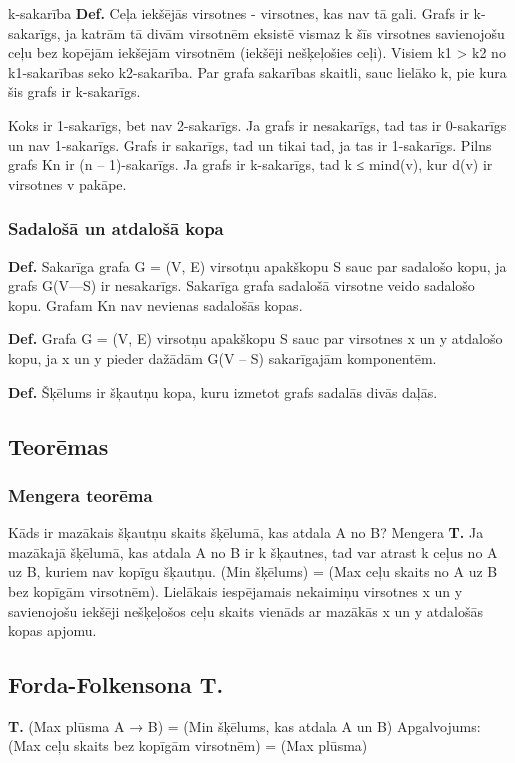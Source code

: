 \documentclass{article}
\begin{document}
k-sakarība
\textbf{Def.} Ceļa iekšējās virsotnes - virsotnes, kas nav tā gali.  Grafs ir k-sakarīgs, ja katrām tā divām virsotnēm eksistē vismaz k šīs virsotnes savienojošu ceļu bez kopējām iekšējām virsotnēm (iekšēji nešķeļošies ceļi).  Visiem k1 > k2 no k1-sakarības seko k2-sakarība.  Par grafa sakarības skaitli, sauc lielāko k, pie kura šis grafs ir k-sakarīgs.

Koks ir 1-sakarīgs, bet nav 2-sakarīgs.  Ja grafs ir nesakarīgs, tad tas ir 0-sakarīgs un nav 1-sakarīgs.  Grafs ir sakarīgs, tad un tikai tad, ja tas ir 1-sakarīgs.  Pilns grafs Kn ir (n – 1)-sakarīgs.  Ja grafs ir k-sakarīgs, tad k ≤ mind(v), kur d(v) ir virsotnes v pakāpe.

\subsubsection{Sadalošā un atdalošā kopa}

\textbf{Def.}  Sakarīga grafa G = (V, E) virsotņu apakškopu S sauc par sadalošo kopu, ja grafs
G(V—S) ir nesakarīgs.
Sakarīga grafa sadalošā virsotne veido sadalošo kopu.  Grafam Kn nav nevienas sadalošās kopas.

\textbf{Def.}  Grafa G = (V, E) virsotņu apakškopu S sauc par virsotnes x un y atdalošo kopu, ja x un y pieder dažādām G(V – S) sakarīgajām komponentēm.

\textbf{Def.} Šķēlums ir šķautņu kopa, kuru izmetot grafs sadalās divās daļās.

\subsection{Teorēmas}

\subsubsection{Mengera teorēma}
Kāds ir mazākais šķautņu skaits šķēlumā, kas atdala A no B?
Mengera \textbf{T. } Ja mazākajā šķēlumā, kas atdala A no B ir k šķautnes, tad var atrast k ceļus no A uz B, kuriem nav kopīgu šķautņu.  (Min šķēlums) = (Max ceļu skaits no A uz B bez kopīgām virsotnēm). Lielākais iespējamais nekaimiņu virsotnes x un y savienojošu iekšēji nešķeļošos ceļu skaits vienāds ar mazākās x un y atdalošās kopas apjomu.

\subsection{Forda-Folkensona T.}
\textbf{T. }(Max plūsma A → B) = (Min šķēlums, kas atdala A un B)
Apgalvojums: (Max ceļu skaits bez kopīgām virsotnēm) = (Max plūsma)

\printindex
\end{document}
